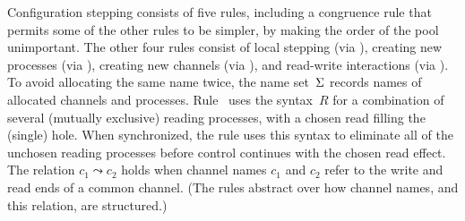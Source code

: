 Configuration stepping consists of five  rules, including a congruence
rule  that permits some of the other rules to be simpler,
by making the order of the pool unimportant.
%
The other four rules consist of local stepping (via ),
creating new processes (via ),
creating new channels (via ),
and read-write interactions (via ).
%
To avoid allocating the same name twice, 
the name set~$\Sigma$ records names of allocated channels and processes.
%
Rule~ uses the syntax~$R$ for a combination of several (mutually exclusive) 
reading processes, with a chosen read filling the (single) hole.
%
When synchronized, 
the rule uses this syntax to eliminate all of the unchosen reading processes 
before control continues with the chosen read effect.
%
The relation $c_1 \leadsto c_2$ holds when 
channel names $c_1$ and $c_2$ refer to the 
write and read ends of a common channel.
%
(The rules abstract over how channel names, and this relation, are structured.)


